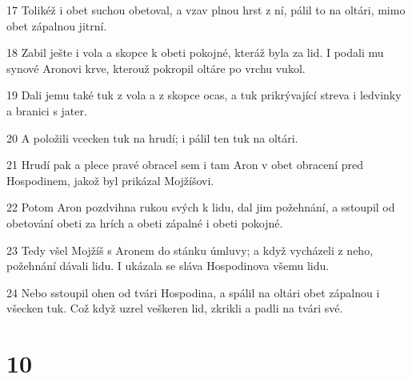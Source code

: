 \par 17 Tolikéž i obet suchou obetoval, a vzav plnou hrst z ní, pálil to na oltári, mimo obet zápalnou jitrní.
\par 18 Zabil ješte i vola a skopce k obeti pokojné, kteráž byla za lid. I podali mu synové Aronovi krve, kterouž pokropil oltáre po vrchu vukol.
\par 19 Dali jemu také tuk z vola a z skopce ocas, a tuk prikrývající streva i ledvinky a branici s jater.
\par 20 A položili vcecken tuk na hrudí; i pálil ten tuk na oltári.
\par 21 Hrudí pak a plece pravé obracel sem i tam Aron v obet obracení pred Hospodinem, jakož byl prikázal Mojžíšovi.
\par 22 Potom Aron pozdvihna rukou svých k lidu, dal jim požehnání, a sstoupil od obetování obeti za hrích a obeti zápalné i obeti pokojné.
\par 23 Tedy všel Mojžíš s Aronem do stánku úmluvy; a když vycházeli z neho, požehnání dávali lidu. I ukázala se sláva Hospodinova všemu lidu.
\par 24 Nebo sstoupil ohen od tvári Hospodina, a spálil na oltári obet zápalnou i všecken tuk. Což když uzrel veškeren lid, zkrikli a padli na tvári své.

\chapter{10}

